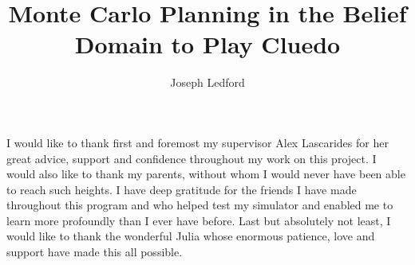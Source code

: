 \documentclass[msc, ai, logo, twoside, notimes, parskip, leftchapter, normalheadings]{infthesis}
\begin{document}
\begin{preliminary}


\title{\vspace{2.25cm}Monte Carlo Planning \hspace{8cm} in the Belief Domain \hspace{8cm} to Play Cluedo}
\author{Joseph Ledford}


\maketitle



\begin{acknowledgements}
I would like to thank first and foremost my supervisor Alex Lascarides for her great advice, support and confidence throughout my work on this project. I would also like to thank my parents, without whom I would never have been able to reach such heights. I have deep gratitude for the friends I have made throughout this program and who helped test my simulator and enabled me to learn more profoundly than I ever have before. Last but absolutely not least, I would like to thank the wonderful Julia whose enormous patience, love and support have made this all possible.
\end{acknowledgements}

\standarddeclaration

\tableofcontents

\end{preliminary}
\end{document}
